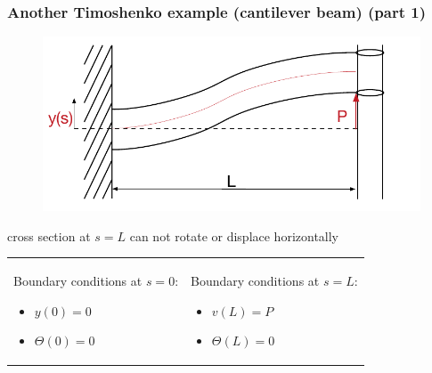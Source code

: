 \begin{frame}
  \frametitle{Another Timoshenko example (cantilever beam) (part 1)}
  \vspace{-0.7em}
  \begin{figure}
    \centering
    \includegraphics[width=16cm, keepaspectratio=true]{sections/traditional_beams/images/TimoshenkoCanitleverExample2part1}
  \end{figure}
  \vspace{-0.5em}
  cross section at $s=L$ can not rotate or displace horizontally
  \vspace{1em}
  
  \begin{tabularx}{\linewidth}{XX}
    {
      Boundary conditions at $s=0$:
      \begin{itemize}
        \item $y(0) = 0$
        \item $\Theta(0) = 0$
      \end{itemize}
    } & {
      Boundary conditions at $s=L$:
      \begin{itemize}
        \item $v(L) = P$
        \item $\Theta(L) = 0$
      \end{itemize}
    }
  \end{tabularx}
  
\end{frame}


